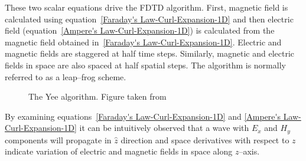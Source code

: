 These two scalar equations drive the FDTD algorithm. First, magnetic field is calculated using equation~\ref{Faraday's Law-Curl-Expansion-1D} and then electric field (equation~\ref{Ampere's Law-Curl-Expansion-1D}) is calculated from the magnetic field obtained in~\ref{Faraday's Law-Curl-Expansion-1D}. Electric and magnetic fields are staggered at half time steps. Similarly, magnetic and electric fields in space are also spaced at half spatial steps. The algorithm is normally referred to as a leap--frog scheme.
\begin{figure}[here]
\centering
\caption{The Yee algorithm. Figure taken from~\cite{JBSchneiderUFDTD}}
\label{Algorithm}
\end{figure}
By examining equations~\ref{Faraday's Law-Curl-Expansion-1D} and \ref{Ampere's Law-Curl-Expansion-1D} it can be intuitively observed that a wave with $E_x$ and $H_y$ components will propagate in $\hat{z}$ direction and space derivatives with respect to $z$ indicate variation of electric and magnetic fields in space along $z$--axis.

